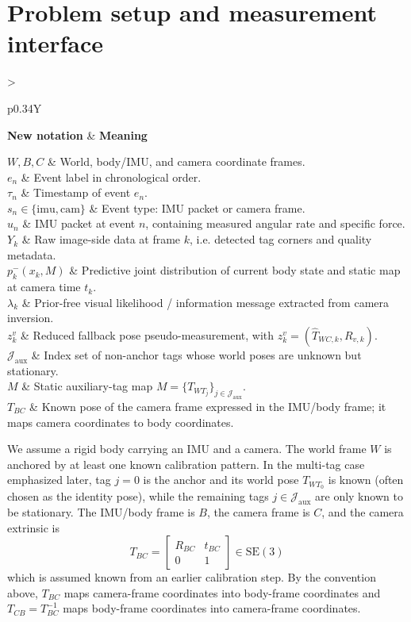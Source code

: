 \documentclass[11pt]{report}
\newcommand{\SE}{\mathrm{SE}(3)}
\newcommand{\NotationTable}[1]{%
\vspace{0.6mm}
{\scriptsize
\setlength{\tabcolsep}{2.5pt}
\begin{tabularx}{\columnwidth}{>{\raggedright\arraybackslash}p{0.34\columnwidth}Y}
\toprule
\textbf{New notation} & \textbf{Meaning}\\
\midrule
#1\\
\bottomrule
\end{tabularx}}
\vspace{0.8mm}}
\begin{document}
\section{Problem setup and measurement interface}
\NotationTable{
$W,B,C$ & World, body/IMU, and camera coordinate frames.\\
$e_n$ & Event label in chronological order.\\
$\tau_n$ & Timestamp of event $e_n$.\\
$s_n\in\{\mathrm{imu},\mathrm{cam}\}$ & Event type: IMU packet or camera frame.\\
$u_n$ & IMU packet at event $n$, containing measured angular rate and specific force.\\
$Y_k$ & Raw image-side data at frame $k$, i.e. detected tag corners and quality metadata.\\
$p^-_k(x_k,M)$ & Predictive joint distribution of current body state and static map at camera time $t_k$.\\
$\lambda_k$ & Prior-free visual likelihood / information message extracted from camera inversion.\\
$z_k^v$ & Reduced fallback pose pseudo-measurement, with $z_k^v=(\widehat T_{WC,k},R_{v,k})$.\\
$\mathcal J_{\mathrm{aux}}$ & Index set of non-anchor tags whose world poses are unknown but stationary.\\
$M$ & Static auxiliary-tag map $M=\{T_{WT_j}\}_{j\in\mathcal J_{\mathrm{aux}}}$.\\
$T_{BC}$ & Known pose of the camera frame expressed in the IMU/body frame; it maps camera coordinates to body coordinates.}

We assume a rigid body carrying an IMU and a camera. The world frame $W$ is anchored by at least one known calibration pattern. In the multi-tag case emphasized later, tag $j=0$ is the anchor and its world pose $T_{WT_0}$ is known (often chosen as the identity pose), while the remaining tags $j\in\mathcal J_{\mathrm{aux}}$ are only known to be stationary. The IMU/body frame is $B$, the camera frame is $C$, and the camera extrinsic is
\begin{equation}
T_{BC}=\begin{bmatrix}R_{BC}&t_{BC}\\0&1\end{bmatrix}\in\SE
\end{equation}
which is assumed known from an earlier calibration step. By the convention above, $T_{BC}$ maps camera-frame coordinates into body-frame coordinates and $T_{CB}=T_{BC}^{-1}$ maps body-frame coordinates into camera-frame coordinates.
\end{document}
